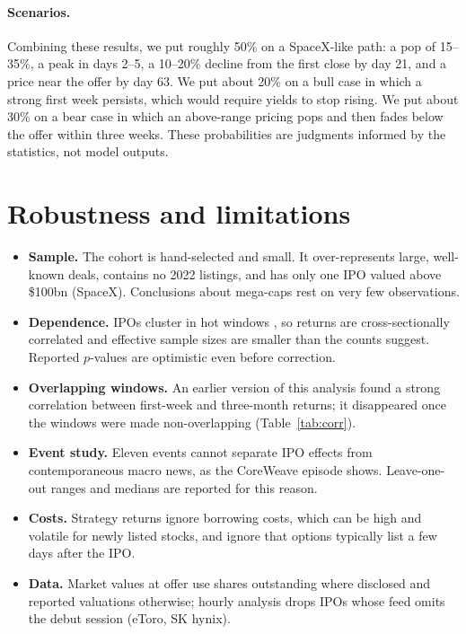 \documentclass[11pt]{article}
\begin{document}



\paragraph{Scenarios.} Combining these results, we put roughly 50\% on a SpaceX-like path: a pop of 15--35\%, a peak in days 2--5, a 10--20\% decline from the first close by day 21, and a price near the offer by day 63. We put about 20\% on a bull case in which a strong first week persists, which would require yields to stop rising. We put about 30\% on a bear case in which an above-range pricing pops and then fades below the offer within three weeks. These probabilities are judgments informed by the statistics, not model outputs.

\section{Robustness and limitations}

\begin{itemize}
\item \textbf{Sample.} The cohort is hand-selected and small. It over-represents large, well-known deals, contains no 2022 listings, and has only one IPO valued above \$100bn (SpaceX). Conclusions about mega-caps rest on very few observations.
\item \textbf{Dependence.} IPOs cluster in hot windows \citep{lowry2002}, so returns are cross-sectionally correlated and effective sample sizes are smaller than the counts suggest. Reported $p$-values are optimistic even before correction.
\item \textbf{Overlapping windows.} An earlier version of this analysis found a strong correlation between first-week and three-month returns; it disappeared once the windows were made non-overlapping (Table~\ref{tab:corr}).
\item \textbf{Event study.} Eleven events cannot separate IPO effects from contemporaneous macro news, as the CoreWeave episode shows. Leave-one-out ranges and medians are reported for this reason.
\item \textbf{Costs.} Strategy returns ignore borrowing costs, which can be high and volatile for newly listed stocks, and ignore that options typically list a few days after the IPO.
\item \textbf{Data.} Market values at offer use shares outstanding where disclosed and reported valuations otherwise; hourly analysis drops IPOs whose feed omits the debut session (eToro, SK hynix).
\end{itemize}
\end{document}
